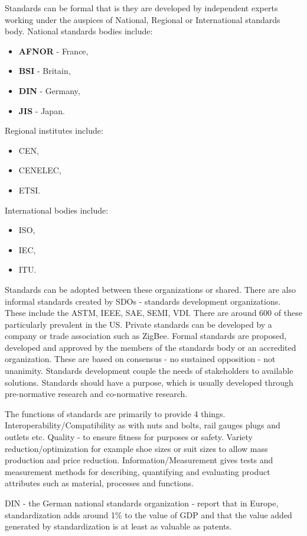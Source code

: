 Standards can be formal that is they are developed by independent experts working under the auspices of National, Regional or International standards body. 
National standards bodies include:
\begin{itemize}
\item \textbf{AFNOR} - France, 
\item \textbf{BSI} - Britain, 
\item \textbf{DIN} - Germany, 
\item \textbf{JIS} - Japan. 
\end{itemize}
Regional institutes include:
\begin{itemize}
\item CEN, 
\item CENELEC, 
\item ETSI. 
\end{itemize}
International bodies include:
\begin{itemize}
\item ISO, 
\item IEC,
\item  ITU. 
\end{itemize}
Standards can be adopted between these organizations or shared. 
There are also informal standards created by SDOs - standards development organizations. 
These include the ASTM, IEEE, SAE, SEMI, VDI. 
There are around 600 of these particularly prevalent in the US. 
Private standards can be developed by a company or trade association such as ZigBee.
 Formal standards are proposed, developed and approved by the members of the standards body or an accredited organization. 
These are based on consensus - no sustained opposition - not unanimity. 
Standards development couple the needs of stakeholders to available solutions. 
Standards should have a purpose, which is usually developed through pre-normative research and co-normative research.

The functions of standards are primarily to provide 4 things. 
Interoperability/Compatibility as with nuts and bolts, rail gauges plugs and outlets etc. 
Quality - to ensure fitness for purposes or safety. 
Variety reduction/optimization for example shoe sizes or suit sizes to allow mass production and price reduction. 
Information/Measurement gives tests and measurement methods for describing, quantifying and evaluating product attributes such as material, processes and functions.

DIN - the German national standards organization - report that in Europe, standardization adds around 1\% to the value of GDP and that the value added generated by standardization is at least as valuable as patents. 

